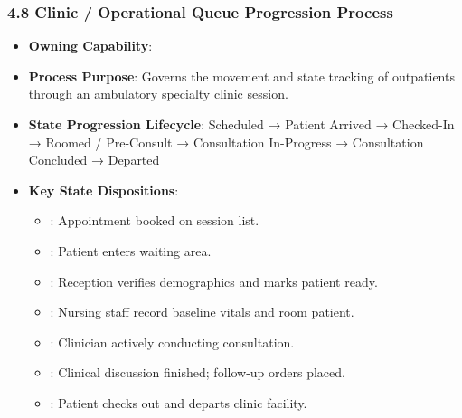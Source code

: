 \par\smallskip
{}\label{rad:processes:187}
\subsubsection*{4.8 Clinic /\allowbreak{} Operational Queue Progression Process}
\label{rad:processes:188}

\begin{itemize}

\item 
\textbf{Owning Capability}: \texttt{}



\item 
\textbf{Process Purpose}: Governs the movement and state tracking of outpatients through an ambulatory specialty clinic session.



\item 
\textbf{State Progression Lifecycle}: Scheduled → Patient Arrived → Checked-In → Roomed /\allowbreak{} Pre-Consult → Consultation In-Progress → Consultation Concluded → Departed



\item 
\textbf{Key State Dispositions}:


\begin{itemize}

\item 
\texttt{}: Appointment booked on session list.



\item 
\texttt{}: Patient enters waiting area.



\item 
\texttt{}: Reception verifies demographics and marks patient ready.



\item 
\texttt{}: Nursing staff record baseline vitals and room patient.



\item 
\texttt{}: Clinician actively conducting consultation.



\item 
\texttt{}: Clinical discussion finished; follow-up orders placed.



\item 
\texttt{}: Patient checks out and departs clinic facility.



\end{itemize}


\end{itemize}
\label{rad:processes:201}

